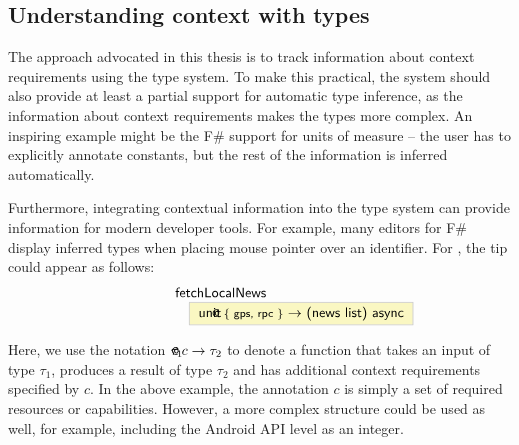 
\newcommand{\introfuncblack}[3]{ \ident{#1 \hspace{-1em}\footnotesize{@} \{ #2 \}} $\rightarrow$ \ident{#3}  }
\newcommand{\introfunc}[3]{ \ident{#1 \hspace{-1em}\footnotesize{@} \aclrd{\{ #2 \}}} $\rightarrow$ \ident{#3}  }
\newcommand{\introvar}[2]{ \ident{#1 \hspace{-1em}\footnotesize{@} \cclrd{#2} } }


\subsection{Understanding context with types}

The approach advocated in this thesis is to track information about context requirements using
the type system. To make this practical, the system should also provide at least a partial support for
automatic type inference, as the information about context requirements makes the types more complex.
An inspiring example might be the F\# support for units of measure \cite{app-units} -- the user has
to explicitly annotate constants, but the rest of the information is inferred automatically.

Furthermore, integrating contextual information into the type system can provide information for
modern developer tools. For example, many editors for F\# display inferred types when placing mouse
pointer over an identifier. For , the tip could appear as follows:
%
\vspace{0.5em}
\begin{equation*}
\hspace{5em}
\begin{array}{l}
\ident{fetchLocalNews}\\
\hspace{1em} \fcolorbox{tooltipb}{tooltipy}{
	\introfuncblack{unit}{gps, rpc}{(news~list)~async}
}
\end{array}
\end{equation*}
\vspace{0.5em}

\noindent
Here, we use the notation $\tau_1 \,\textnormal{\sffamily \hspace{-1em}\footnotesize{@}}\, c \rightarrow \tau_2$ to denote
a function that takes an input of type $\tau_1$, produces a result of type $\tau_2$ and has additional
context requirements specified by $c$. In the above example, the annotation $c$ is simply a set of
required resources or capabilities. However, a more complex structure could be used as well, for example,
including the Android API level as an integer.

